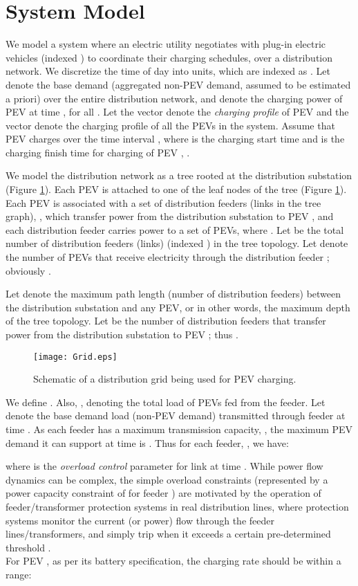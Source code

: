 \documentclass[12pt,draftcls,onecolumn]{IEEEtran}
\begin{document}
\section{System Model}\label{sec:model}
\indent We model a system where an electric utility negotiates with  plug-in electric vehicles (indexed )  to coordinate their charging schedules, over a distribution network. We discretize the time of day into  units, which are indexed as . Let  denote the base demand (aggregated non-PEV demand, assumed to be estimated a priori) over the entire distribution network, and  denote the charging power of PEV  at time , for all . Let the vector  denote the \emph{charging profile} of PEV  and the vector  denote the charging profile of all the  PEVs in the system. Assume that PEV  charges over the time interval , where  is the charging start time and  is the charging finish time for charging of PEV , .

We model the distribution network as a tree rooted at the distribution substation (Figure \ref{Topology}). Each PEV is attached to one of the leaf nodes of the tree (Figure \ref{Topology}). Each PEV  is associated with a set of distribution feeders (links in the tree graph), , which transfer power from the distribution substation to PEV , and each distribution feeder  carries power to a set  of PEVs, where . Let  be the total number of distribution feeders (links) (indexed ) in the tree topology. Let  denote the number of PEVs that receive electricity through the distribution feeder ; obviously .

Let  denote the maximum path length (number of distribution feeders) between the distribution substation and any PEV, or in other words, the maximum depth of the tree topology. Let  be the number of distribution feeders that transfer power from the distribution substation to PEV ; thus .\\
\begin{figure}
\centering
\texttt{[image: Grid.eps]}
\caption{Schematic of a distribution grid being used for PEV charging.}
\label{Topology}
\end{figure}
\indent We define . Also, , denoting the total load of PEVs fed from the  feeder. Let  denote the base demand load (non-PEV demand) transmitted through feeder  at time . As each feeder  has a maximum transmission capacity, , the maximum PEV demand it can support at time  is . Thus for each feeder, , we have:

where  is the \textit{overload control} parameter for link  at time . While power flow dynamics can be complex, the simple overload constraints (represented by a power capacity constraint of  for feeder ) are motivated by the operation of feeder/transformer protection systems in real distribution lines, where protection systems monitor the current (or power) flow through the feeder lines/transformers, and simply trip when it exceeds a certain pre-determined threshold \cite{GE79}.\\
\indent For PEV , as per its battery specification, the charging rate should be within a range:
\end{document}
